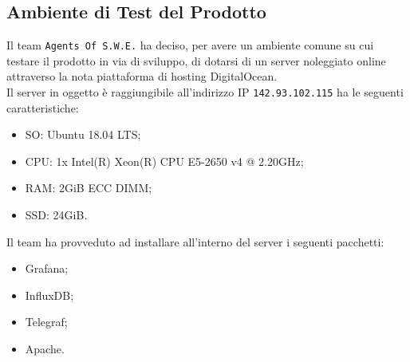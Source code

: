 \subsection{Ambiente di Test del Prodotto}\label{Server}
Il team \texttt{Agents Of S.W.E.} ha deciso, per avere un ambiente comune su cui testare il prodotto in via di sviluppo, di dotarsi di un server noleggiato online attraverso la nota piattaforma di hosting DigitalOcean\glossario.\\
Il server in oggetto è raggiungibile all'indirizzo IP \texttt{142.93.102.115} ha le seguenti caratteristiche:
\begin{itemize}
	\item SO: Ubuntu 18.04 LTS;
	\item CPU: 1x Intel(R) Xeon(R) CPU E5-2650 v4 @ 2.20GHz;
	\item RAM: 2GiB ECC DIMM;
	\item SSD: 24GiB.
\end{itemize}
Il team ha provveduto ad installare all'interno del server i seguenti pacchetti:
\begin{itemize}
	\item Grafana;
	\item InfluxDB;
	\item Telegraf;
	\item Apache\glossario.
\end{itemize}
